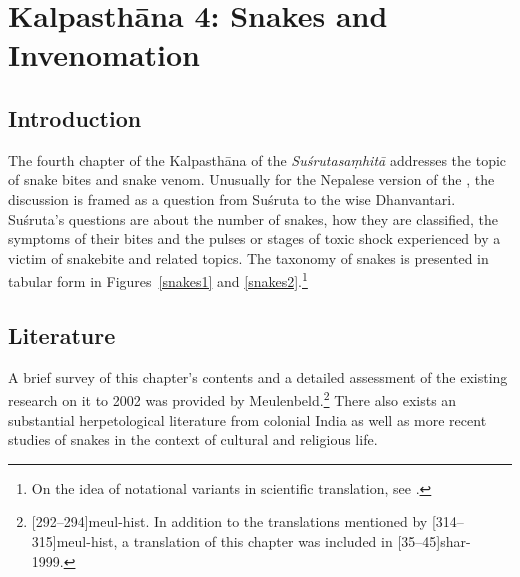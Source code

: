 \chapter{Kalpasthāna 4: Snakes and Invenomation}

\section{Introduction} 

The fourth chapter of the Kalpasthāna of the \emph{Suśrutasaṃhitā}
addresses the topic of snake bites and snake venom. Unusually for the
Nepalese version of the \SS, the discussion is framed as a question from
Suśruta to the wise Dhanvantari.  Suśruta's questions are about the
number of snakes, how they are classified, the symptoms of their bites
and the pulses or stages of toxic shock experienced by a victim of
snakebite and related topics.  The taxonomy of snakes is presented in 
tabular form in Figures~\ref{snakes1} and
\ref{snakes2}.\footnote{On the idea of notational variants in scientific
    translation, see \cites{elsh-2008}{saru-2016}[81--83]{wuja-2021}.}

\section{Literature} 

A brief survey of this chapter's contents and a detailed assessment of
the existing research on it to 2002 was provided by
Meulenbeld.\footnote{[292--294]{meul-hist}. In addition to the
    translations mentioned by [314--315]{meul-hist}, a translation
    of this chapter was included in [35--45]{shar-1999}.}  There
    also exists an substantial herpetological literature from colonial India
    as well as more recent studies of snakes in the context of cultural and
    religious life.



